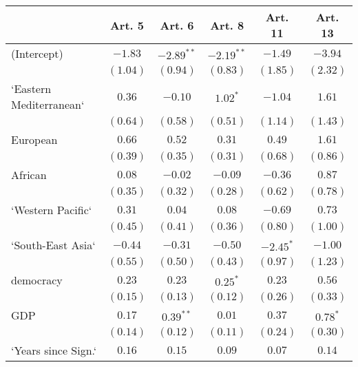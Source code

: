 
\begin{table}[!h]
\begin{center}
\begin{tabular}{l c c c c c }
\toprule
 & Art. 5 & Art. 6 & Art. 8 & Art. 11 & Art. 13 \\
\midrule
(Intercept)             & $-1.83$      & $-2.89^{**}$ & $-2.19^{**}$ & $-1.49$      & $-3.94$      \\
                        & $(1.04)$     & $(0.94)$     & $(0.83)$     & $(1.85)$     & $(2.32)$     \\
`Eastern Mediterranean` & $0.36$       & $-0.10$      & $1.02^{*}$   & $-1.04$      & $1.61$       \\
                        & $(0.64)$     & $(0.58)$     & $(0.51)$     & $(1.14)$     & $(1.43)$     \\
European                & $0.66$       & $0.52$       & $0.31$       & $0.49$       & $1.61$       \\
                        & $(0.39)$     & $(0.35)$     & $(0.31)$     & $(0.68)$     & $(0.86)$     \\
African                 & $0.08$       & $-0.02$      & $-0.09$      & $-0.36$      & $0.87$       \\
                        & $(0.35)$     & $(0.32)$     & $(0.28)$     & $(0.62)$     & $(0.78)$     \\
`Western Pacific`       & $0.31$       & $0.04$       & $0.08$       & $-0.69$      & $0.73$       \\
                        & $(0.45)$     & $(0.41)$     & $(0.36)$     & $(0.80)$     & $(1.00)$     \\
`South-East Asia`       & $-0.44$      & $-0.31$      & $-0.50$      & $-2.45^{*}$  & $-1.00$      \\
                        & $(0.55)$     & $(0.50)$     & $(0.43)$     & $(0.97)$     & $(1.23)$     \\
democracy               & $0.23$       & $0.23$       & $0.25^{*}$   & $0.23$       & $0.56$       \\
                        & $(0.15)$     & $(0.13)$     & $(0.12)$     & $(0.26)$     & $(0.33)$     \\
GDP                     & $0.17$       & $0.39^{**}$  & $0.01$       & $0.37$       & $0.78^{*}$   \\
                        & $(0.14)$     & $(0.12)$     & $(0.11)$     & $(0.24)$     & $(0.30)$     \\
`Years since Sign.`     & $0.16$       & $0.15$       & $0.09$       & $0.07$       & $0.14$       \\

\end{tabular}
\end{center}
\end{table}
